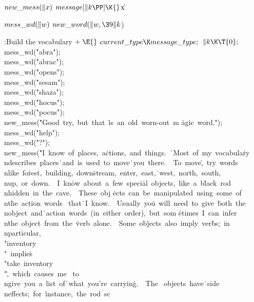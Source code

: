 \Y\B\4\D$\\{new\_mess}(\|x)$ \5
$\\{message}[\|k\PP]\K{}$\|x\par
\B\4\D$\\{mess\_wd}(\|w)$ \5
$\\{new\_word}(\|w,\39\|k{}$)\par
\Y\B\4:Build the vocabulary\X${}\mathrel+\E{}$\6
$\\{current\_type}\K\\{message\_type};{}$\6
${}\|k\K\T{0};{}$\6
\\{mess\_wd}(\.{"abra"});\5
\\{mess\_wd}(\.{"abrac"});\6
\\{mess\_wd}(\.{"opens"});\5
\\{mess\_wd}(\.{"sesam"});\5
\\{mess\_wd}(\.{"shaza"});\6
\\{mess\_wd}(\.{"hocus"});\5
\\{mess\_wd}(\.{"pocus"});\6
\\{new\_mess}(\.{"Good\ try,\ but\ that\ }\)\.{is\ an\ old\ worn-out\ m}\)%
\.{agic\ word."});\6
\\{mess\_wd}(\.{"help"});\5
\\{mess\_wd}(\.{"?"});\6
\\{new\_mess}(\.{"I\ know\ of\ places,\ a}\)\.{ctions,\ and\ things.\ }\)\.{\
Most\ of\ my\ vocabula}\)\.{ry\\ndescribes\ places}\)\.{\ and\ is\ used\ to\
move}\)\.{\ you\ there.\ \ To\ move}\)\.{,\ try\ words\\nlike\ fo}\)\.{rest,\
building,\ down}\)\.{stream,\ enter,\ east,}\)\.{\ west,\ north,\ south,}\)\.{%
\\nup,\ or\ down.\ \ I\ kn}\)\.{ow\ about\ a\ few\ speci}\)\.{al\ objects,\
like\ a\ b}\)\.{lack\ rod\\nhidden\ in\ }\)\.{the\ cave.\ \ These\ obj}\)%
\.{ects\ can\ be\ manipula}\)\.{ted\ using\ some\ of\\nt}\)\.{he\ action\ words%
\ that}\)\.{\ I\ know.\ \ Usually\ yo}\)\.{u\ will\ need\ to\ give\ }\)\.{both\
the\\nobject\ and}\)\.{\ action\ words\ (in\ ei}\)\.{ther\ order),\ but\ som}\)%
\.{etimes\ I\ can\ infer\\n}\)\.{the\ object\ from\ the\ }\)\.{verb\ alone.\ \
Some\ ob}\)\.{jects\ also\ imply\ ver}\)\.{bs;\ in\\nparticular,\ }\)\.{%
\\"inventory\\"\ implie}\)\.{s\ \\"take\ inventory\\"}\)\.{,\ which\ causes\ me%
\ to}\)\.{\\ngive\ you\ a\ list\ of}\)\.{\ what\ you're\ carryin}\)\.{g.\ \ The%
\ objects\ have}\)\.{\ side\\neffects;\ for\ }\)\.{instance,\ the\ rod\ sc}\)%
